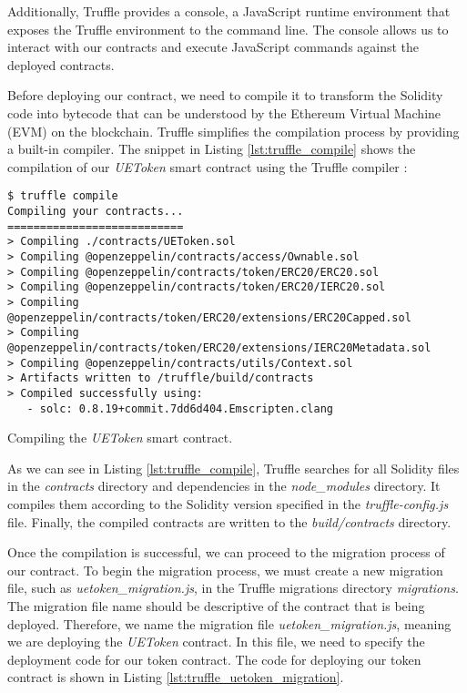 Additionally, Truffle provides a console, a JavaScript runtime environment that exposes the Truffle environment to the command line. The console allows us to interact with our contracts and execute JavaScript commands against the deployed contracts.

Before deploying our contract, we need to compile it to transform the Solidity code into bytecode that can be understood by the Ethereum Virtual Machine (EVM)
on the blockchain. Truffle simplifies the compilation process by providing a built-in compiler. The snippet in Listing \ref{lst:truffle_compile} shows the compilation
of our \textit{UEToken} smart contract using the Truffle compiler :


\begin{listing}[H]
    \begin{verbatim}
$ truffle compile
Compiling your contracts...
===========================
> Compiling ./contracts/UEToken.sol
> Compiling @openzeppelin/contracts/access/Ownable.sol
> Compiling @openzeppelin/contracts/token/ERC20/ERC20.sol
> Compiling @openzeppelin/contracts/token/ERC20/IERC20.sol
> Compiling @openzeppelin/contracts/token/ERC20/extensions/ERC20Capped.sol
> Compiling @openzeppelin/contracts/token/ERC20/extensions/IERC20Metadata.sol
> Compiling @openzeppelin/contracts/utils/Context.sol
> Artifacts written to /truffle/build/contracts
> Compiled successfully using:
   - solc: 0.8.19+commit.7dd6d404.Emscripten.clang
    \end{verbatim}
    \caption{Compiling the \textit{UEToken} smart contract.}
    \label{lst:truffle_compile}
\end{listing}

As we can see in Listing \ref{lst:truffle_compile}, Truffle searches for all Solidity files in the \textit{contracts} directory and dependencies in the \textit{node\_modules} directory.
It compiles them according to the Solidity version specified in the \textit{truffle-config.js} file. Finally, the compiled contracts are written to the \textit{build/contracts} directory.


Once the compilation is successful, we can proceed to the migration process of our contract. To begin the migration process, we must create a new migration
file, such as \textit{uetoken\_migration.js}, in the Truffle migrations directory \textit{migrations}. The migration file name should be descriptive of the contract
that is being deployed. Therefore, we name the migration file \textit{uetoken\_migration.js}, meaning we are deploying the \textit{UEToken} contract. In this file,
we need to specify the deployment code for our token contract. The code for deploying our token contract is shown in Listing \ref{lst:truffle_uetoken_migration}.

